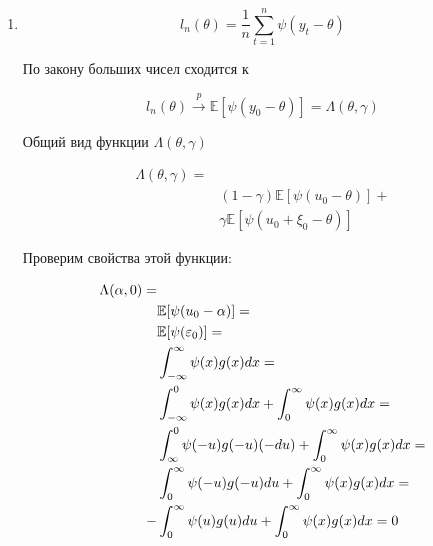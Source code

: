\documentclass{article}
\begin{document}
\begin{enumerate}
	      \[
		      \mathrm{GES}(\theta, \mathcal{M}_{\gamma}) =
		      \sup_{\mu_{\gamma} \in \mathcal{M}_{\gamma}}
		      \left| \mathrm{IF}(\theta, \mu_{\gamma}) \right| =
		      \infty
	      \]

	      Так как нет ограничений на $\mathbb{E} [\xi_1]$. Следовательно, оценка не робастна.

	\item
	      \[
		      l_n(\theta) = \frac{1}{n} \sum_{t=1}^n \psi(y_t - \theta)
	      \]

	      По закону больших чисел сходится к

	      \[
		      l_n(\theta) \xrightarrow{p} \mathbb{E} [\psi(y_0 - \theta)] =
		      \Lambda(\theta, \gamma)
	      \]

	      Общий вид функции $\Lambda(\theta, \gamma)$

	      \begin{equation*}
		      \begin{aligned}
			      \Lambda(\theta, \gamma) = &                                                \\
			                                & (1 - \gamma) \mathbb{E} [\psi(u_0 - \theta)] + \\
			                                & \gamma \mathbb{E} [\psi(u_0 + \xi_0 - \theta)]
		      \end{aligned}
	      \end{equation*}

	      Проверим свойства этой функции:

	      \begin{align}
		      \Lambda(\alpha,0)  = & \notag                                                                                    \\
		                           & \mathbb{E} [\psi(u_0 - \alpha)] = \notag                                                  \\
		                           & \mathbb{E} [\psi(\varepsilon_0)] = \notag                                                 \\
		                           & \int_{-\infty}^{\infty} \psi(x) g(x) dx = \notag                                          \\
		                           & \int_{-\infty}^0 \psi(x) g(x) dx + \int_0^{\infty} \psi(x) g(x) dx = \notag               \\
		                           & \int_{\infty}^0 \psi(-u) g(-u) (-du) + \int_0^{\infty} \psi(x) g(x) dx = \notag           \\
		                           & \int_0^{\infty} \psi(-u) g(-u) du + \int_0^{\infty} \psi(x) g(x) dx = \label{eq:even_odd} \\
		      -                    & \int_0^{\infty} \psi(u) g(u) du + \int_0^{\infty} \psi(x) g(x) dx = 0 \notag
	      \end{align}


\end{enumerate}
\end{document}
